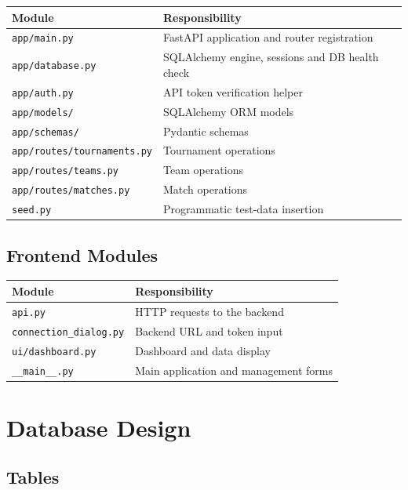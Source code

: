 \documentclass[11pt,a4paper]{article}
\begin{document}
\begin{longtable}{p{}p{}}
\toprule
\textbf{Module} & \textbf{Responsibility} \\
\midrule
\texttt{app/main.py} & FastAPI application and router registration \\
\texttt{app/database.py} & SQLAlchemy engine, sessions and DB health check \\
\texttt{app/auth.py} & API token verification helper \\
\texttt{app/models/} & SQLAlchemy ORM models \\
\texttt{app/schemas/} & Pydantic schemas \\
\texttt{app/routes/tournaments.py} & Tournament operations \\
\texttt{app/routes/teams.py} & Team operations \\
\texttt{app/routes/matches.py} & Match operations \\
\texttt{seed.py} & Programmatic test-data insertion \\
\bottomrule
\end{longtable}

\subsection{Frontend Modules}

\begin{longtable}{p{}p{}}
\toprule
\textbf{Module} & \textbf{Responsibility} \\
\midrule
\texttt{api.py} & HTTP requests to the backend \\
\texttt{connection\_dialog.py} & Backend URL and token input \\
\texttt{ui/dashboard.py} & Dashboard and data display \\
\texttt{\_\_main\_\_.py} & Main application and management forms \\
\bottomrule
\end{longtable}

\section{Database Design}

\subsection{Tables}
\end{document}
